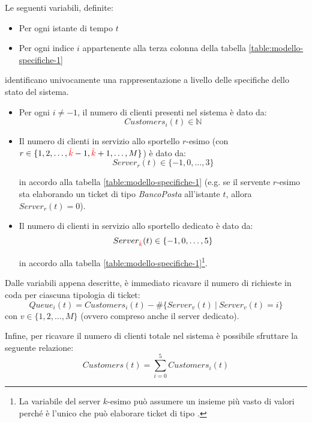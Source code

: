 Le seguenti variabili, definite:
\begin{itemize}
\item Per ogni istante di tempo $t$
\item Per ogni indice $i$ appartenente alla terza colonna della tabella \ref{table:modello-specifiche-1}
\end{itemize}
identificano univocamente una rappresentazione a livello delle specifiche dello stato del sistema.
\begin{itemize}
\item Per ogni $i \neq -1$, il numero di clienti presenti nel sistema è dato da:
\begin{equation}
\label{eqn:modello-specifiche-2}
Customers_i(t) \in \mathbb{N}
\end{equation}
\item Il numero di clienti in servizio allo sportello $r$-esimo (con $r \in \lbrace 1, 2, \dots, {\color{red}\hat{k}}-1, {\color{red}\hat{k}}+1, \dots, M \rbrace$) è dato da:
\begin{equation}
\label{eqn:modello-specifiche-3}
Server_r(t) \in \lbrace -1, 0, \dots, 3 \rbrace
\end{equation}

in accordo alla tabella \ref{table:modello-specifiche-1} (e.g. se il servente $r$-esimo sta elaborando un ticket di tipo \uo{} \textsl{BancoPosta} all'istante $t$, allora $Server_r(t)=0$).
\item Il numero di clienti in servizio allo sportello dedicato è dato da:
\begin{equation}
\label{eqn:modello-specifiche-4}
Server_{\color{red}\hat{k}}(t) \in \lbrace -1, 0, \dots, 5 \rbrace
\end{equation}

in accordo alla tabella \ref{table:modello-specifiche-1}\footnote{La variabile del server $k$-esimo può assumere un insieme più vasto di valori perché è l'unico che può elaborare ticket di tipo \sr{}.}.
\end{itemize}

Dalle variabili appena descritte, è immediato ricavare il numero di richieste in coda per ciascuna tipologia di ticket:
\begin{equation}
Queue_i(t) = Customers_i(t) - \# \lbrace Server_v(t)\ \vert\ Server_v(t) = i \rbrace
\end{equation}
con $v \in \lbrace 1, 2, \dots, M \rbrace$ (ovvero compreso anche il server dedicato).

Infine, per ricavare il numero di clienti totale nel sistema è possibile sfruttare la seguente relazione:
\begin{equation}
Customers(t) = \sum_{i=0}^{5} Customers_i(t)
\end{equation}

